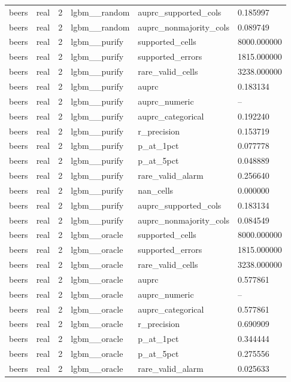 \begin{tabular}{llllll}
beers & real & 2 & lgbm\_\_random & auprc\_supported\_cols & 0.185997 \\
beers & real & 2 & lgbm\_\_random & auprc\_nonmajority\_cols & 0.089749 \\
beers & real & 2 & lgbm\_\_purify & supported\_cells & 8000.000000 \\
beers & real & 2 & lgbm\_\_purify & supported\_errors & 1815.000000 \\
beers & real & 2 & lgbm\_\_purify & rare\_valid\_cells & 3238.000000 \\
beers & real & 2 & lgbm\_\_purify & auprc & 0.183134 \\
beers & real & 2 & lgbm\_\_purify & auprc\_numeric & -- \\
beers & real & 2 & lgbm\_\_purify & auprc\_categorical & 0.192240 \\
beers & real & 2 & lgbm\_\_purify & r\_precision & 0.153719 \\
beers & real & 2 & lgbm\_\_purify & p\_at\_1pct & 0.077778 \\
beers & real & 2 & lgbm\_\_purify & p\_at\_5pct & 0.048889 \\
beers & real & 2 & lgbm\_\_purify & rare\_valid\_alarm & 0.256640 \\
beers & real & 2 & lgbm\_\_purify & nan\_cells & 0.000000 \\
beers & real & 2 & lgbm\_\_purify & auprc\_supported\_cols & 0.183134 \\
beers & real & 2 & lgbm\_\_purify & auprc\_nonmajority\_cols & 0.084549 \\
beers & real & 2 & lgbm\_\_oracle & supported\_cells & 8000.000000 \\
beers & real & 2 & lgbm\_\_oracle & supported\_errors & 1815.000000 \\
beers & real & 2 & lgbm\_\_oracle & rare\_valid\_cells & 3238.000000 \\
beers & real & 2 & lgbm\_\_oracle & auprc & 0.577861 \\
beers & real & 2 & lgbm\_\_oracle & auprc\_numeric & -- \\
beers & real & 2 & lgbm\_\_oracle & auprc\_categorical & 0.577861 \\
beers & real & 2 & lgbm\_\_oracle & r\_precision & 0.690909 \\
beers & real & 2 & lgbm\_\_oracle & p\_at\_1pct & 0.344444 \\
beers & real & 2 & lgbm\_\_oracle & p\_at\_5pct & 0.275556 \\
beers & real & 2 & lgbm\_\_oracle & rare\_valid\_alarm & 0.025633 \\

\end{tabular}
